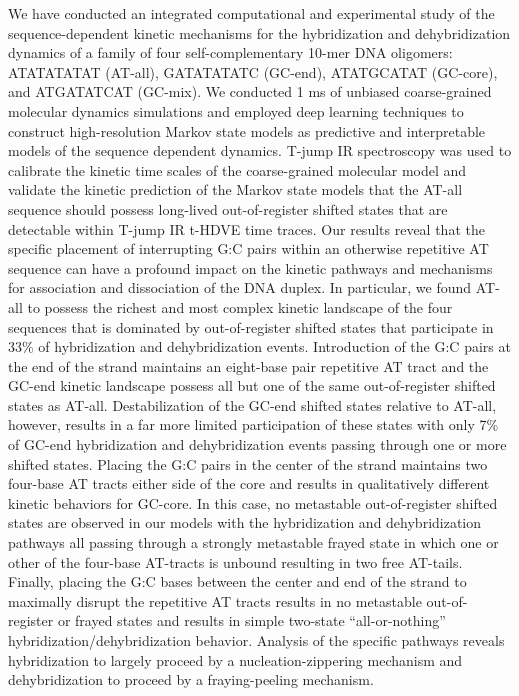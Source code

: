 \documentclass[journal=jpcbfk,manuscript=article]{achemso}
\begin{document}
We have conducted an integrated computational and experimental study of the sequence-dependent kinetic mechanisms for the hybridization and dehybridization dynamics of a family of four self-complementary 10-mer DNA oligomers: ATATATATAT (AT-all), GATATATATC (GC-end), ATATGCATAT (GC-core), and ATGATATCAT (GC-mix). We conducted 1 ms of unbiased coarse-grained molecular dynamics simulations and employed deep learning techniques to construct high-resolution Markov state models as predictive and interpretable models of the sequence dependent dynamics. T-jump IR spectroscopy was used to calibrate the kinetic time scales of the coarse-grained molecular model and validate the kinetic prediction of the Markov state models that the AT-all sequence should possess long-lived out-of-register shifted states that are detectable within T-jump IR t-HDVE time traces. Our results reveal that the specific placement of interrupting G:C pairs within an otherwise repetitive AT sequence can have a profound impact on the kinetic pathways and mechanisms for association and dissociation of the DNA duplex. In particular, we found AT-all to possess the richest and most complex kinetic landscape of the four sequences that is dominated by out-of-register shifted states that participate in 33\% of hybridization and dehybridization events. Introduction of the G:C pairs at the end of the strand maintains an eight-base pair repetitive AT tract and the GC-end kinetic landscape possess all but one of the same out-of-register shifted states as AT-all. Destabilization of the GC-end shifted states relative to AT-all, however, results in a far more limited participation of these states with only 7\% of GC-end hybridization and dehybridization events passing through one or more shifted states. Placing the G:C pairs in the center of the strand maintains two four-base AT tracts either side of the core and results in qualitatively different kinetic behaviors for GC-core. In this case, no metastable out-of-register shifted states are observed in our models with the hybridization and dehybridization pathways all passing through a strongly metastable frayed state in which one or other of the four-base AT-tracts is unbound resulting in two free AT-tails. Finally, placing the G:C bases between the center and end of the strand to maximally disrupt the repetitive AT tracts results in no metastable out-of-register or frayed states and results in simple two-state ``all-or-nothing'' hybridization/dehybridization behavior. Analysis of the specific pathways reveals hybridization to largely proceed by a nucleation-zippering mechanism and dehybridization to proceed by a fraying-peeling mechanism. 
\end{document}
